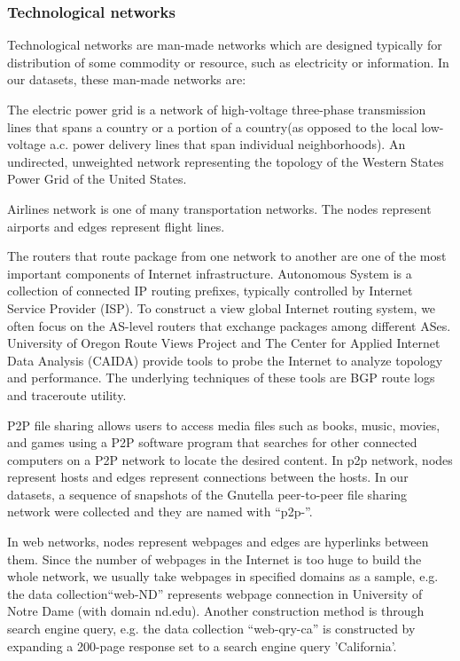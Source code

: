 \documentclass[symmetry,article,submit,moreauthors,pdftex,10pt,a4paper]{Definitions/mdpi}
\begin{document}
\subsubsection{Technological networks}
Technological networks are man-made networks which are designed typically for distribution of some commodity or resource, such as electricity or information. In our datasets, these man-made networks are:
\begin{description}[leftmargin=0cm]
\item [Power grid] The electric power grid is a network of high-voltage three-phase transmission lines that spans a country or a portion of a country(as opposed to the local low-voltage a.c. power delivery lines that span individual neighborhoods). An undirected, unweighted network representing the topology of the Western States Power Grid of the United States.
\item [Airlines] Airlines network is one of many transportation networks. The nodes represent airports and edges represent flight lines.
\item [Autonomous System networks] The routers that route package from one network to another are one of the most important components of Internet infrastructure. Autonomous System is a collection of connected IP routing prefixes, typically controlled by Internet Service Provider (ISP). To construct a view global Internet routing system, we often focus on the AS-level routers that exchange packages among different ASes. University of Oregon Route Views Project and The Center for Applied Internet Data Analysis (CAIDA) provide tools to probe the Internet to analyze topology and performance. The underlying techniques of these tools are BGP route logs and traceroute utility.
\item [Peer-to-peer networks] P2P file sharing allows users to access media files such as books, music, movies, and games using a P2P software program that searches for other connected computers on a P2P network to locate the desired content. In p2p network, nodes represent hosts and edges represent connections between the hosts. In our datasets, a sequence of snapshots of the Gnutella peer-to-peer file sharing network were collected and they are named with ``p2p-''.
\item [Web networks] In web networks, nodes represent webpages and edges are hyperlinks between them. Since the number of webpages in the Internet is too huge to build the whole network, we usually take webpages in specified domains as a sample, e.g. the data collection``web-ND'' represents webpage connection in University of Notre Dame (with domain nd.edu). Another construction method is through search engine query, e.g. the data collection ``web-qry-ca'' is constructed by expanding a 200-page response set to a search engine query 'California'.

\end{description}
\end{document}
